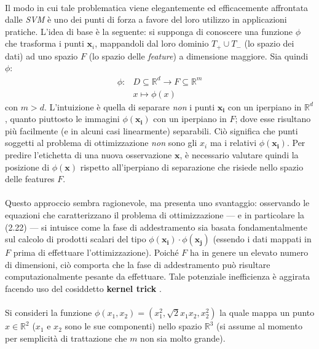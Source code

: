 \paragraph{}
Il modo in cui tale problematica viene elegantemente ed efficacemente affrontata dalle \textit{SVM} è uno dei punti di forza a favore del loro utilizzo in applicazioni pratiche. L'idea di base è la seguente: si supponga di conoscere una funzione $\phi$ che trasforma i punti $\boldsymbol{x}_i$, mappandoli dal loro dominio $T_+ \cup T_-$ (lo spazio dei dati) ad uno spazio $F$ (lo spazio delle \textit{feature}) a dimensione maggiore. Sia quindi $\phi$:
\begin{equation}
\begin{split}
	\phi : & D \subseteq \mathbb{R}^d \longrightarrow F \subseteq \mathbb{R}^m
	\\& x \longmapsto \phi(x)
\end{split}
\end{equation}
con $m > d$. L'intuizione è quella di separare \textit{non} i punti $\boldsymbol{x_i}$ con un iperpiano in $\mathbb{R}^d$, quanto piuttosto le immagini $\phi(\boldsymbol{x_i})$ con un iperpiano in $F$; dove esse risultano più facilmente (e in alcuni casi linearmente) separabili. Ciò significa che punti soggetti al problema di ottimizzazione \textit{non} sono gli $x_i$ ma i relativi $\phi(\boldsymbol{x_i})$. Per predire l'etichetta di una nuova osservazione  $\boldsymbol{x}$, è necessario valutare quindi la posizione di  $\phi({\boldsymbol{x}})$ rispetto all'iperpiano di separazione che risiede nello spazio delle features $F$.

\paragraph{}
Questo approccio sembra ragionevole, ma presenta uno svantaggio: osservando le equazioni che caratterizzano il problema di ottimizzazione --- e in particolare la (2.22) --- si intuisce come la fase di addestramento sia basata fondamentalmente sul calcolo di prodotti scalari del tipo $\phi(\boldsymbol{x_i}) \cdot \phi(\boldsymbol{x_j})$ (essendo i dati mappati in $F$ prima di effettuare l'ottimizzazione). Poiché $F$ ha in genere un elevato numero di dimensioni, ciò comporta che la fase di addestramento può risultare computazionalmente pesante da effettuare.
Tale potenziale inefficienza è aggirata facendo uso del cosiddetto \textbf{kernel trick} \cite{aizerman}.

\paragraph{}
Si consideri la funzione
$\phi(x_1, x_2) = (x_1^2, \sqrt{2} x_1 x_2, x_2^2)$ la quale mappa un punto $x \in \mathbb{R}^2$ ($x_1$ e $x_2$ sono le sue componenti) nello spazio $\mathbb{R}^3$ (si assume al momento per semplicità di trattazione che $m$ non sia molto grande).

